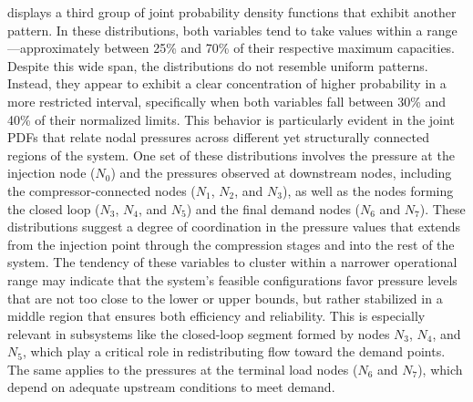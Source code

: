  displays a third group of joint probability density functions that exhibit another pattern. In these distributions, both variables tend to take values within a range—approximately between 25\% and 70\% of their respective maximum capacities. Despite this wide span, the distributions do not resemble uniform patterns. Instead, they appear to exhibit a clear concentration of higher probability in a more restricted interval, specifically when both variables fall between 30\% and 40\% of their normalized limits. This behavior is particularly evident in the joint PDFs that relate nodal pressures across different yet structurally connected regions of the system. One set of these distributions involves the pressure at the injection node ($N_0$) and the pressures observed at downstream nodes, including the compressor-connected nodes ($N_1$, $N_2$, and $N_3$), as well as the nodes forming the closed loop ($N_3$, $N_4$, and $N_5$) and the final demand nodes ($N_6$ and $N_7$). These distributions suggest a degree of coordination in the pressure values that extends from the injection point through the compression stages and into the rest of the system. The tendency of these variables to cluster within a narrower operational range may indicate that the system's feasible configurations favor pressure levels that are not too close to the lower or upper bounds, but rather stabilized in a middle region that ensures both efficiency and reliability. This is especially relevant in subsystems like the closed-loop segment formed by nodes $N_3$, $N_4$, and $N_5$, which play a critical role in redistributing flow toward the demand points. The same applies to the pressures at the terminal load nodes ($N_6$ and $N_7$), which depend on adequate upstream conditions to meet demand.


